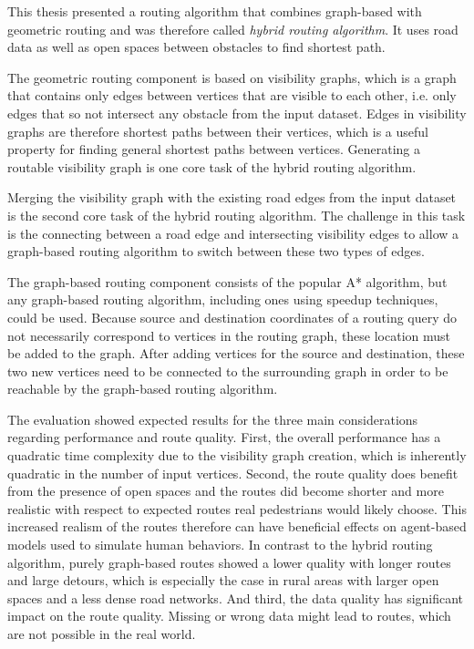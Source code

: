 
This thesis presented a routing algorithm that combines graph-based with geometric routing and was therefore called \emph{hybrid routing algorithm}.
It uses road data as well as open spaces between obstacles to find shortest path.

The geometric routing component is based on visibility graphs, which is a graph that contains only edges between vertices that are visible to each other, i.e. only edges that so not intersect any obstacle from the input dataset.
Edges in visibility graphs are therefore shortest paths between their vertices, which is a useful property for finding general shortest paths between vertices.
Generating a routable visibility graph is one core task of the hybrid routing algorithm.

Merging the visibility graph with the existing road edges from the input dataset is the second core task of the hybrid routing algorithm.
The challenge in this task is the connecting between a road edge and intersecting visibility edges to allow a graph-based routing algorithm to switch between these two types of edges.

The graph-based routing component consists of the popular A* algorithm, but any graph-based routing algorithm, including ones using speedup techniques, could be used.
Because source and destination coordinates of a routing query do not necessarily correspond to vertices in the routing graph, these location must be added to the graph.
After adding vertices for the source and destination, these two new vertices need to be connected to the surrounding graph in order to be reachable by the graph-based routing algorithm.

The evaluation showed expected results for the three main considerations regarding performance and route quality.
First, the overall performance has a quadratic time complexity due to the visibility graph creation, which is inherently quadratic in the number of input vertices.
Second, the route quality does benefit from the presence of open spaces and the routes did become shorter and more realistic with respect to expected routes real pedestrians would likely choose.
This increased realism of the routes therefore can have beneficial effects on agent-based models used to simulate human behaviors.
In contrast to the hybrid routing algorithm, purely graph-based routes showed a lower quality with longer routes and large detours, which is especially the case in rural areas with larger open spaces and a less dense road networks.
And third, the data quality has significant impact on the route quality.
Missing or wrong data might lead to routes, which are not possible in the real world.

